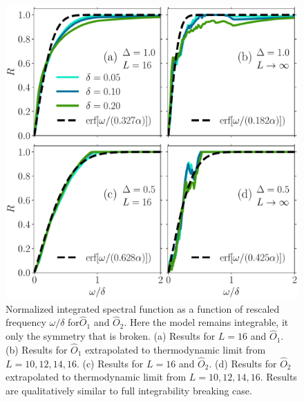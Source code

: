\begin{figure}[htbp]
  \centering
  \includegraphics[width=\figsize\textwidth]{Figures/O12_symmetry_breaking_small.pdf}
  \caption{Normalized integrated spectral function as a function of rescaled 
  frequency \(\omega/\delta\) for\(\hat{O}_1\) and \(\hat{O}_2\). Here the model remains
  integrable, it only the symmetry that is broken.
  (a) Results for \(L=16\) and \(\hat{O}_1\).  (b) Results for \(\hat{O}_1\) extrapolated to
  thermodynamic limit from \(L=10,12,14,16\). (c) Results for \(L=16\) and \(\hat{O}_2\). 
  (d) Results for \(\hat{O}_2\) extrapolated to thermodynamic limit from \(L=10,12,14,16\).
  Results are qualitatively similar to full integrability breaking case. }\label{fig:O12 symmetry}
\end{figure}
